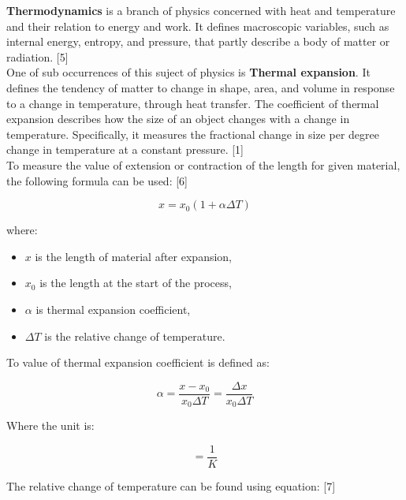 \documentclass[a4paper]{article}
\begin{document}
\textbf{Thermodynamics} is a branch of physics concerned with heat and temperature and their relation to energy and work. It defines macroscopic variables, such as internal energy, entropy, and pressure, that partly describe a body of matter or radiation. [5]\\

One of sub occurrences of this suject of physics is \textbf{Thermal expansion}. It defines the tendency of matter to change in shape, area, and volume in response to a change in temperature, through heat transfer. The coefficient of thermal expansion describes how the size of an object changes with a change in temperature. Specifically, it measures the fractional change in size per degree change in temperature at a constant pressure. [1]\\

To measure the value of extension or contraction of the length for given material, the following formula can be used: [6]

\clearpage

\begin{equation}
x = x_{0} (1 + \alpha \Delta T)
\end{equation}

where:
\begin{itemize}
	\setlength{\itemsep}{1pt}
	\setlength{\parskip}{0pt}
	\setlength{\parsep}{0pt}
\item $x$ is the length of material after expansion,
\item $x_{0}$ is the length at the start of the process,
\item $\alpha$ is thermal expansion coefficient,
\item $\Delta T$ is the relative change of temperature.\\
\end{itemize}

To value of thermal expansion coefficient is defined as: 

\begin{equation}
\alpha = \frac {x - x_{0}} {x_{0} \Delta T} = \frac {\Delta x} {x_{0} \Delta T}
\end{equation}

Where the unit is:

\begin{equation}
[\alpha] = \frac {1}{K}
\end{equation}

The relative change of temperature can be found using equation: [7]
\end{document}
